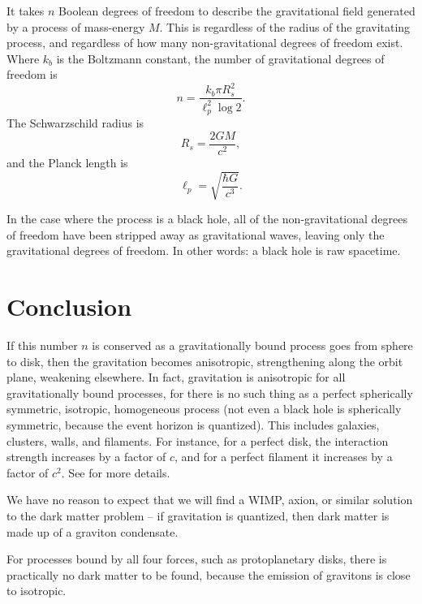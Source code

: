 \documentclass[12pt]{article}
\begin{document}
It takes $n$ Boolean degrees of freedom to describe the gravitational field \cite{hooft, susskind} generated by a process of mass-energy $M$.
This is regardless of the radius of the gravitating process, and regardless of how many non-gravitational degrees of freedom exist.
Where $k_b$ is the Boltzmann constant, the number of gravitational degrees of freedom is
\begin{equation}
n = \frac{k_b \pi R_s^2}{ \ell_p^2 \log 2}.
\end{equation}
The Schwarzschild radius is
\begin{equation}
R_s = \frac{2GM}{c^2},
\end{equation}
and the Planck length is
\begin{equation}
\ell_p = \sqrt{\frac{\hbar G}{c^3}}.
\end{equation}

In the case where the process is a black hole, all of the non-gravitational degrees of freedom have been stripped away as gravitational waves, leaving only the gravitational degrees of freedom.
In other words: a black hole is raw spacetime.


\section{Conclusion}

If this number $n$ is conserved as a gravitationally bound process goes from sphere to disk, then the gravitation becomes anisotropic, strengthening along the orbit plane, weakening elsewhere.
In fact, gravitation is anisotropic for all gravitationally bound processes, for there is no such thing as a perfect spherically symmetric, isotropic, homogeneous process (not even a black hole is spherically symmetric, because the event horizon is quantized).
This includes galaxies, clusters, walls, and filaments.
For instance, for a perfect disk, the interaction strength increases by a factor of $c$, and for a perfect filament it increases by a factor of $c^2$.
See \cite{halayka} for more details.

We have no reason to expect that we will find a WIMP, axion, or similar solution \cite{berger, aalbers, quiskamp, haipeng, hui} to the dark matter problem -- if gravitation is quantized, then dark matter is made up of a graviton condensate.

For processes bound by all four forces, such as protoplanetary disks, there is practically no dark matter to be found, because the emission of gravitons is close to isotropic.
\end{document}
